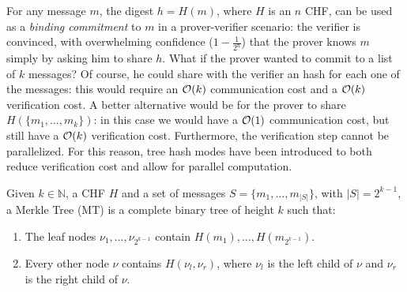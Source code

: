 \noindent For any message \(m\), the digest \(h = H(m)\), where \(H\) is an \(n\) CHF, can be
used as a \emph{binding commitment} to \(m\) in a prover-verifier scenario: the verifier is
convinced, with overwhelming confidence (\(1 - \frac{1}{2^n}\)) that the prover knows \(m\) simply
by asking him to share \(h\).
What if the prover wanted to commit to a list of \(k\) messages?
Of course, he could share with the verifier an hash for each one of the messages: this would
require an \(\mathcal{O}(k)\) communication cost and a \(\mathcal{O}(k)\) verification cost.
A better alternative would be for the prover to share \(H(\{m_1, \dots, m_k\})\): in this case
we would have a \(\mathcal{O}(1)\) communication cost, but still have a \(\mathcal{O}(k)\) verification cost.
Furthermore, the verification step cannot be parallelized.
For this reason, tree hash modes have been introduced to both reduce verification cost and allow
for parallel computation.
\begin{definition}
	Given \(k \in \mathbb{N}\), a CHF \(H\) and a set of messages \(S = \{m_1, \dots, m_{|S|}\} \),
	with \(|S| = 2^{k-1}\), a Merkle Tree (MT) is a complete binary tree of height \(k\) such that:
	\begin{enumerate}
		\item The leaf nodes \(\nu_1, \dots, \nu_{2^{k-1}}\) contain \(H(m_1), \dots,
		      H(m_{2^{k-1}})\).
		\item Every other node \(\nu \) contains \(H(\nu_l, \nu_r)\), where \(\nu_l\) is the left
		      child of \(\nu \) and \(\nu_r\) is the right child of \(\nu \).
	\end{enumerate}
\end{definition}

